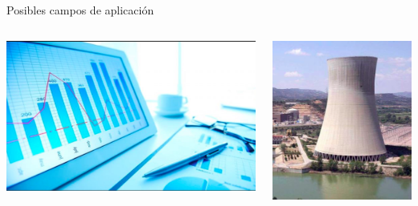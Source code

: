 \documentclass{bredelebeamer}
\begin{document}
\begin{frame}{Posibles campos de aplicación}
\begin{columns}
\begin{column}{0.5\textwidth}
\begin{center}
\includegraphics[scale=0.2]{images/ap1.png}\\
\end{center}
\end{column}
\begin{column}{0.3\textwidth}
\begin{center}
\includegraphics[scale=0.2]{images/ap2.png}\\
\end{center}

\end{column}
\end{columns}
\end{frame}
\end{document}
